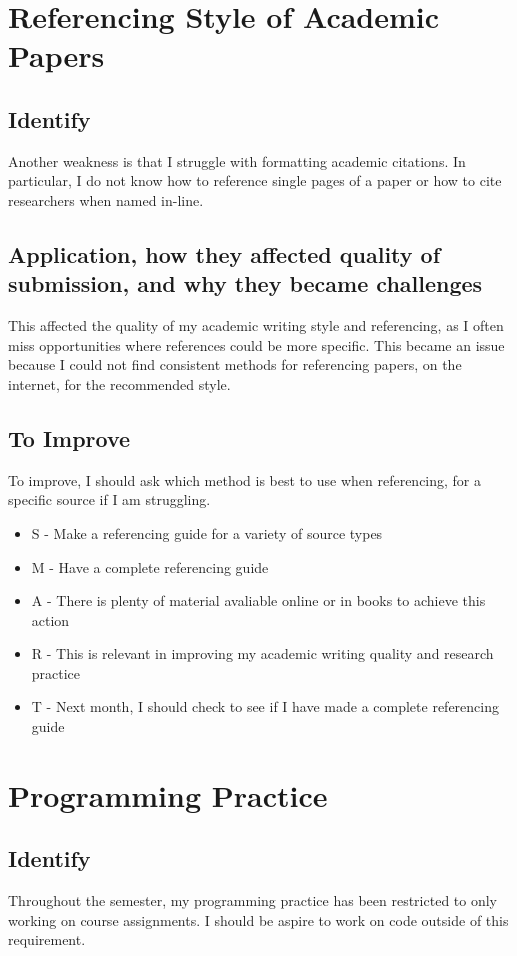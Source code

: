 \documentclass{scrartcl}
\begin{document}
\section*{Referencing Style of Academic Papers}
\subsection*{Identify}
Another weakness is that I struggle with formatting academic citations. In particular, I do not know how to reference single pages of a paper or how to cite researchers when named in-line.

\subsection*{Application, how they affected quality of submission, and why they became challenges}
This affected the quality of my academic writing style and referencing, as I often miss opportunities where references could be more specific. This became an issue because I could not find consistent methods for referencing papers, on the internet, for the recommended style.  

\subsection*{To Improve}
To improve, I should ask which method is best to use when referencing, for a specific source if I am struggling.

 \begin{itemize}
   \item  S - Make a referencing guide for a variety of source types
	\item M - Have a complete referencing guide
	\item A - There is plenty of material avaliable online or in books to achieve this action
	\item R - This is relevant in improving my academic writing quality and research practice
	\item T - Next month, I should check to see if I have made a complete referencing guide
 \end{itemize}

\section*{Programming Practice}
\subsection*{Identify}
Throughout the semester, my programming practice has been restricted to only working on course assignments. I should be aspire to work on code outside of this requirement.
\end{document}
